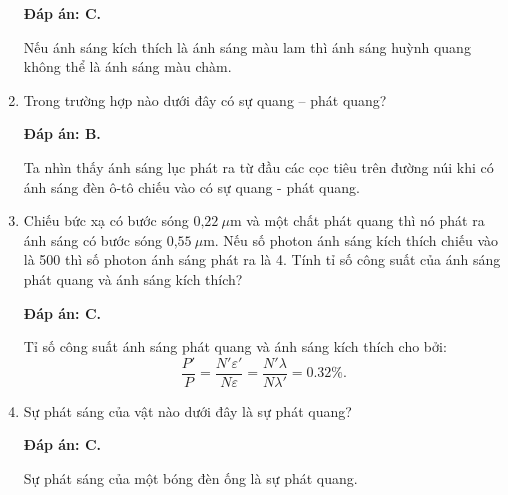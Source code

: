 \begin{enumerate}[label=\bfseries Câu \arabic*:]
	\loigiai
	{		\textbf{Đáp án: C.}
		
Nếu ánh sáng kích thích là ánh sáng màu lam thì ánh sáng huỳnh quang không thể là ánh sáng màu chàm.
		
	}
	
	\item {} 
		\cauhoi
	{Trong trường hợp nào dưới đây có sự quang – phát quang?
	}
	
	\loigiai
	{		\textbf{Đáp án: B.}
		
Ta nhìn thấy ánh sáng lục phát ra từ đầu các cọc tiêu trên đường núi khi có ánh sáng đèn ô-tô chiếu vào có sự quang - phát quang. 
		
	}
	
	\item {} 
		\cauhoi
	{Chiếu bức xạ có bước sóng $\text{0,22}\ \mu\text{m}$ và một chất phát quang thì nó phát ra ánh sáng có bước sóng $\text{0,55}\ \mu\text{m}$.
	Nếu số photon ánh sáng kích thích chiếu vào là 500 thì số photon ánh sáng phát ra là 4. Tính tỉ số công suất của ánh sáng phát quang và ánh sáng kích thích?
	}
	
	\loigiai
	{		\textbf{Đáp án: C.}
		
Tỉ số công suất ánh sáng phát quang và ánh sáng kích thích cho bởi:
$$
	\dfrac{P'}{P} = \dfrac{N'\varepsilon'}{N\varepsilon} = \dfrac{N' \lambda}{N \lambda'} = \num{0,32} \%.
$$
		
	}
	
	\item {} 	
	\cauhoi
	{Sự phát sáng của vật nào dưới đây là sự phát quang?
	}
	
	\loigiai
	{		\textbf{Đáp án: C.}
		
Sự phát sáng của một bóng đèn ống là sự phát quang.
		
	}
	

	
\end{enumerate}
